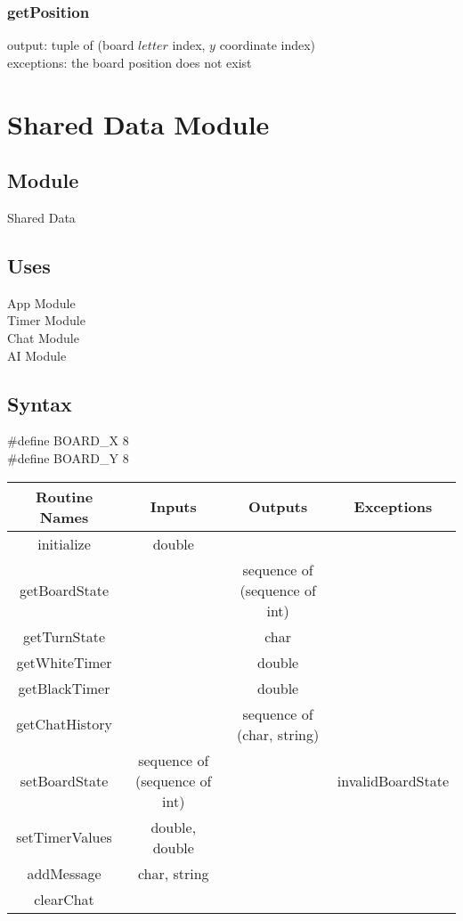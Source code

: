 \documentclass{article}
\begin{document}
        \subsubsection*{getPosition}
            output: tuple of (board $letter$ index, $y$ coordinate index) \\ 
            exceptions: the board position does not exist

            
\newpage
\section*{Shared Data Module}
    \subsection*{Module}
        Shared Data
    
    \subsection*{Uses}
        App Module \\
        Timer Module \\
        Chat Module \\
        AI Module 
    
    \subsection*{Syntax}
        \#define BOARD\_X 8\\
        \#define BOARD\_Y 8
        
        \begin{center}
            \begin{tabular}{|c|c|c|c|} 
                \hline
                Routine Names & Inputs & Outputs & Exceptions \\
                \hline
                initialize & double & & \\
                \hline
                getBoardState & & sequence of (sequence of int) & \\ 
                \hline
                getTurnState & & char & \\
                \hline
                getWhiteTimer & & double & \\ 
                \hline
                getBlackTimer & & double & \\ 
                \hline
                getChatHistory & & sequence of (char, string) & \\ 
                \hline
                setBoardState & sequence of (sequence of int) & & invalidBoardState\\ 
                \hline
                setTimerValues & double, double & & \\ 
                \hline
                addMessage & char, string & & \\ 
                \hline
                clearChat & & & \\
                \hline
            \end{tabular}
        \end{center}
    
\end{document}

